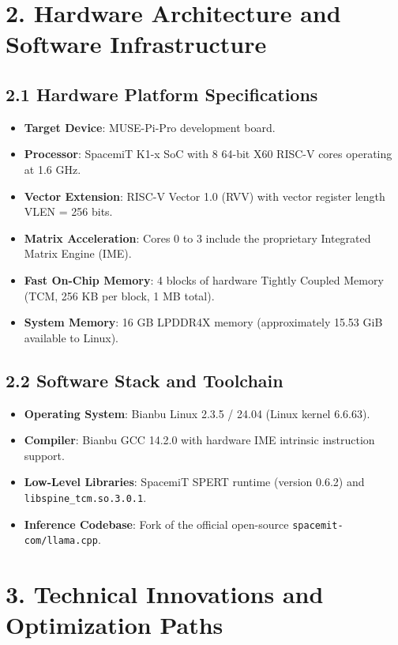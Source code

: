 \documentclass[10pt,a4paper]{article}
\begin{document}
\section{2. Hardware Architecture and Software Infrastructure}

\subsection{2.1 Hardware Platform Specifications}
\begin{itemize}
  \item \textbf{Target Device}: MUSE-Pi-Pro development board.
  \item \textbf{Processor}: SpacemiT K1-x SoC with 8 64-bit X60 RISC-V cores operating at 1.6 GHz.
  \item \textbf{Vector Extension}: RISC-V Vector 1.0 (RVV) with vector register length VLEN = 256 bits.
  \item \textbf{Matrix Acceleration}: Cores 0 to 3 include the proprietary Integrated Matrix Engine (IME).
  \item \textbf{Fast On-Chip Memory}: 4 blocks of hardware Tightly Coupled Memory (TCM, 256 KB per block, 1 MB total).
  \item \textbf{System Memory}: 16 GB LPDDR4X memory (approximately 15.53 GiB available to Linux).
\end{itemize}

\subsection{2.2 Software Stack and Toolchain}
\begin{itemize}
  \item \textbf{Operating System}: Bianbu Linux 2.3.5 / 24.04 (Linux kernel 6.6.63).
  \item \textbf{Compiler}: Bianbu GCC 14.2.0 with hardware IME intrinsic instruction support.
  \item \textbf{Low-Level Libraries}: SpacemiT SPERT runtime (version 0.6.2) and \texttt{libspine\_tcm.so.3.0.1}.
  \item \textbf{Inference Codebase}: Fork of the official open-source \texttt{spacemit-com/llama.cpp}.
\end{itemize}

\section{3. Technical Innovations and Optimization Paths}
\end{document}
